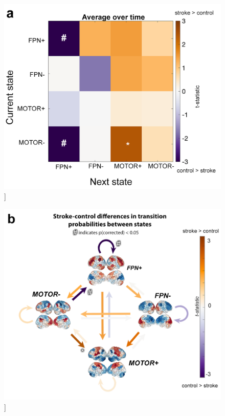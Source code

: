 \documentclass[phd,tocprelim]{cornell}
\renewcommand{\caption}[1]{\singlespacing\hangcaption{#1}\normalspacing}
\begin{document}
\null
\vfill
\clearpage
\null
\vfill
\begin{figure}[h!]
		\ContinuedFloat
		\captionsetup{labelformat=adja-page}
    \centering
    \includegraphics[width=1\textwidth]{chapter2/Figure4a.png}
    \caption[]{}
\end{figure}
\null
\vfill
\clearpage    
    \null
\vfill
\begin{figure}[h!]
		\ContinuedFloat
		\captionsetup{labelformat=adja-page}
    \centering
    \includegraphics[width=1\textwidth]{chapter2/Figure4b.png}
    \caption[]{}
\end{figure}
\end{document}
